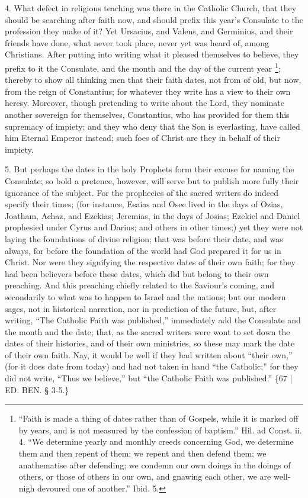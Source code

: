 4. What defect in religious
teaching was there in the Catholic Church, that they should be
searching after faith now, and should prefix this year's Consulate to
the profession they make of it? Yet Ursacius, and Valens, and
Germinius, and their friends have done, what never took place, never
yet was heard of, among Christians. After putting into writing what it
pleased themselves to believe, they prefix to it the Consulate, and
the month and the day of the current year \footnote{``Faith is made a thing of dates rather than of Gospels, while it is
marked off by years, and is not measured by the confession of baptism.''
Hil. ad Const. ii. 4. ``We determine yearly and monthly creeds
concerning God, we determine them and then repent of them; we repent
and then defend them; we anathematise after defending; we condemn our
own doings in the doings of others, or those of others in our own, and
gnawing each other, we are well-nigh devoured one of another.'' Ibid.
5.}; thereby to show all thinking men that their faith dates,
not from of old, but now, from the reign of Constantius; for whatever
they write has a view to their own heresy. Moreover, though pretending
to write about the Lord, they nominate another sovereign for
themselves, Constantius, who has provided for them this supremacy of
impiety; and they who deny that the Son is everlasting, have called
him Eternal Emperor instead; such foes of Christ are they in behalf of
their impiety.

5. But perhaps the dates in
the holy Prophets form their excuse for naming the Consulate; so bold
a pretence, however, will serve but to publish more fully their
ignorance of the subject. For the prophecies of the sacred writers do
indeed specify their times; (for instance, Esaias and Osee lived in
the days of Ozias, Joatham, Achaz, and Ezekias; Jeremias, in the days
of Josias; Ezekiel and Daniel prophesied under Cyrus and Darius; and
others in other times;) yet they were not laying the foundations of
divine religion; that was before their date, and was always, for
before the foundation of the world had God prepared it for us in
Christ. Nor were they signifying the respective dates of their own
faith; for they had been believers before these dates, which did but
belong to their own preaching. And this preaching chiefly related to
the Saviour's coming, and secondarily to what was to happen to Israel
and the nations; but our modern sages, not in historical narration,
nor in prediction of the future, but, after writing, ``The Catholic
Faith was published,'' immediately add the Consulate and the month and
the date; that, as the sacred writers were wont to set down the dates
of their histories, and of their own ministries, so these may mark the
date of their own faith. Nay, it would be well if they had written
about ``their own,'' (for it does date from today) and had not taken in
hand ``the Catholic;'' for they did not write, ``Thus we believe,'' but ``the
Catholic Faith was published.'' \{67 | ED.
BEN. § 3-5.\}

